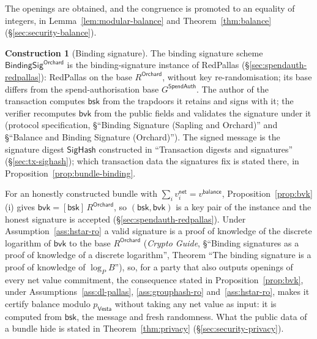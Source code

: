 \documentclass[11pt,a4paper]{article}
\theoremstyle{definition}
\newtheorem{construction}[theorem]{Construction}
\newcommand{\Vesta}{\ensuremath{\mathsf{Vesta}}}
\begin{document}
The openings are obtained, and the congruence is promoted to an equality of
integers, in Lemma~\ref{lem:modular-balance} and Theorem~\ref{thm:balance}
(\S\ref{sec:security-balance}).

\begin{construction}[Binding signature]
The binding signature scheme $\mathsf{BindingSig}^{\mathsf{Orchard}}$ is the
binding-signature instance of RedPallas (\S\ref{sec:spendauth-redpallas}):
RedPallas on the base $R^{\mathsf{Orchard}}$, without key
re-randomisation; its base differs from the spend-authorisation base
$G^{\mathsf{SpendAuth}}$. The author of the transaction computes
$\mathsf{bsk}$ from the trapdoors it retains and signs with it; the
verifier recomputes $\mathsf{bvk}$ from the public fields and validates the
signature under it (protocol specification, \S``Binding Signature (Sapling
and Orchard)'' and \S``Balance and Binding Signature (Orchard)''). The
signed message is the signature digest $\mathsf{SigHash}$ constructed in
``Transaction digests and signatures'' (\S\ref{sec:tx-sighash}); which
transaction data the signatures fix is stated there, in
Proposition~\ref{prop:bundle-binding}.
\end{construction}

For an honestly constructed bundle with
$\sum_i v^{\mathsf{net}}_i = v^{\mathsf{balance}}$,
Proposition~\ref{prop:bvk}(i) gives
$\mathsf{bvk} = [\mathsf{bsk}]\,R^{\mathsf{Orchard}}$, so
$(\mathsf{bsk}, \mathsf{bvk})$ is a key pair of the instance and the honest
signature is accepted (\S\ref{sec:spendauth-redpallas}). Under
Assumption~\ref{ass:hstar-ro} a valid signature is a proof of knowledge of
the discrete logarithm of $\mathsf{bvk}$ to the base $R^{\mathsf{Orchard}}$
(\emph{Crypto Guide}, \S``Binding signatures as a proof of knowledge of a
discrete logarithm'', Theorem ``The binding signature is a proof of
knowledge of $\log_P B$''), so, for a party that also outputs openings of
every net value commitment, the consequence stated in
Proposition~\ref{prop:bvk}, under Assumptions~\ref{ass:dl-pallas},
\ref{ass:grouphash-ro} and~\ref{ass:hstar-ro}, makes it certify balance
modulo $p_{\Vesta}$ without taking any net value as input: it is computed
from $\mathsf{bsk}$, the message and fresh randomness.
What the public data of a bundle hide is stated in
Theorem~\ref{thm:privacy} (\S\ref{sec:security-privacy}).
\end{document}
